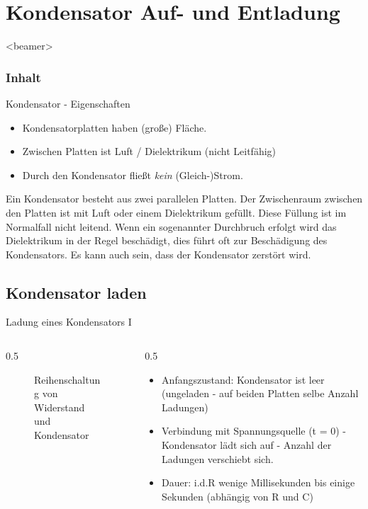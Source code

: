 \section[Kondensator]{Kondensator Auf- und Entladung}
\begin{frame}<beamer>
  \frametitle{Inhalt}
  \tableofcontents[hideothersubsections]
\end{frame}

\begin{frame}{Kondensator - Eigenschaften}
 \begin{itemize}
  \item Kondensatorplatten haben (große) Fläche.
  \item Zwischen Platten ist Luft / Dielektrikum (nicht Leitfähig)
  \item Durch den Kondensator fließt \emph{kein} (Gleich-)Strom.
 \end{itemize}
\end{frame}

Ein Kondensator besteht aus zwei parallelen Platten. Der Zwischenraum zwischen den Platten ist mit Luft oder einem Dielektrikum gefüllt. Diese Füllung ist im Normalfall nicht leitend. Wenn ein sogenannter Durchbruch erfolgt wird das Dielektrikum in der Regel beschädigt, dies führt oft zur Beschädigung des Kondensators. Es kann auch sein, dass der Kondensator zerstört wird.

\subsection{Kondensator laden}
\begin{frame}{Ladung eines Kondensators I}
  \begin{columns}
    \begin{column}{0.5\textwidth}
     \begin{figure}[htb]
    \caption{Reihenschaltung von Widerstand und Kondensator}
    \label{fig:StromkreisMitQuelleUndC}
  \end{figure}
    \end{column}
    \begin{column}{0.5\textwidth}
      \begin{itemize}
        \item Anfangszustand: Kondensator ist leer (ungeladen - auf beiden Platten selbe Anzahl Ladungen)
        \item Verbindung mit Spannungsquelle  (t = 0) - Kondensator lädt sich auf - Anzahl der Ladungen verschiebt sich.
        \item Dauer: i.d.R wenige Millisekunden bis einige Sekunden (abhängig von R und C)
      \end{itemize}
    \end{column}
  \end{columns}
\end{frame}

